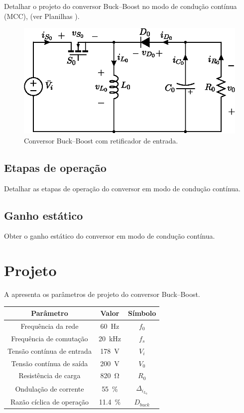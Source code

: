 Detalhar o projeto do conversor Buck--Boost \cite{inep-cccc-2006} no modo de condução contínua (MCC), (ver Planilhas \cite{noauthor_ptc_nodate}).

\begin{figure}[!h]
	\centering
	\includegraphics[width=0.8\linewidth]{Figs/BuckBoost}
	\caption{Conversor Buck--Boost com retificador de entrada.}
	\label{fig:buckboost}
\end{figure}

\subsection{Etapas de operação}
Detalhar as etapas de operação do conversor em modo de condução contínua.

\subsection{Ganho estático}
Obter o ganho estático do conversor em modo de condução contínua.

\section{Projeto}

A  apresenta os parâmetros de projeto do conversor Buck--Boost.

\begin{center}
	\label{tab:parametrosBuckBoost}
	\begin{tabular}{@{}ccc@{}}
		\toprule
		\textbf{Parâmetro} & \textbf{Valor} & \textbf{Símbolo} \\ \midrule			
		Frequência  da rede        & \SI{60}{\hertz}     & $f_0$  \\		
		Frequência de comutação        & \SI{20}{\kilo\hertz}     & $f_s$  \\	
		Tensão contínua de entrada         &  \SI{178}{\V}      & $V_i$  \\
		Tensão contínua de saída         &  \SI{200}{\V}      & $V_0$  \\
		Resistência de carga        & \SI{820}{\ohm}      & $R_0$  \\
		Ondulação de corrente       & \SI{55}{\%}    & $\Delta_{i_{L_0}}$    \\ 
		Razão cíclica de operação       & \SI{11.4}{\%}    & $D_{buck}$    \\  \bottomrule	
	\end{tabular}
\end{center}

